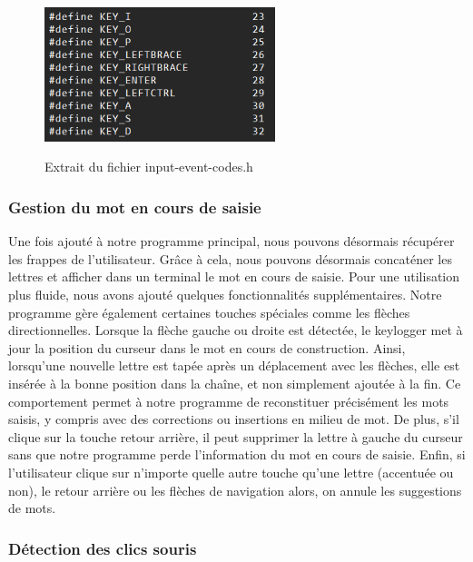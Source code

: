 \documentclass[a4paper, 11pt]{report}
\begin{document}
{\begin{figure}[H]
	\begin{center}
		{\includegraphics[width=0.6\textwidth]{images/fichier_touche.png}}
	\end{center}
	\caption{Extrait du fichier input-event-codes.h}
	\label{fig:lecture_touche}
\end{figure}

\subsubsection{Gestion du mot en cours de saisie}

Une fois ajouté à notre programme principal, nous pouvons désormais récupérer les frappes de l'utilisateur. Grâce à cela, nous pouvons désormais concaténer les lettres et afficher dans un terminal le mot en cours de saisie. Pour une utilisation plus fluide, nous avons ajouté quelques fonctionnalités supplémentaires. Notre programme gère également certaines touches spéciales comme les flèches directionnelles. Lorsque la flèche gauche ou droite est détectée, le keylogger met à jour la position du curseur dans le mot en cours de construction. Ainsi, lorsqu’une nouvelle lettre est tapée après un déplacement avec les flèches, elle est insérée à la bonne position dans la chaîne, et non simplement ajoutée à la fin. Ce comportement permet à notre programme de reconstituer précisément les mots saisis, y compris avec des corrections ou insertions en milieu de mot. De plus, s'il clique sur la touche retour arrière, il peut supprimer la lettre à gauche du curseur sans que notre programme perde l'information du mot en cours de saisie. Enfin, si l'utilisateur clique sur n'importe quelle autre touche qu'une lettre (accentuée ou non), le retour arrière ou les flèches de navigation alors, on annule les suggestions de mots. \\


\subsubsection{Détection des clics souris}

}
\end{document}
